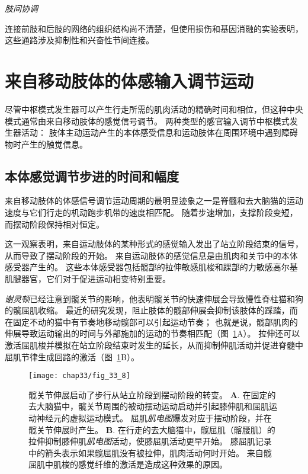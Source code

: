 \textit{肢间协调}

连接前肢和后肢的网络的组织结构尚不清楚，但使用损伤和基因消融的实验表明，这些通路涉及抑制性和兴奋性节间连接。



\section{来自移动肢体的体感输入调节运动}

尽管中枢模式发生器可以产生行走所需的肌肉活动的精确时间和相位，但这种中央模式通常由来自移动肢体的感觉信号调节。
两种类型的感官输入调节中枢模式发生器活动：
肢体主动运动产生的本体感受信息和运动肢体在周围环境中遇到障碍物时产生的触觉信息。



\subsection{本体感觉调节步进的时间和幅度}

来自移动肢体的体感信号调节运动周期的最明显迹象之一是脊髓和去大脑猫的运动速度与它们行走的机动跑步机带的速度相匹配。
随着步速增加，支撑阶段变短，而摆动阶段保持相对恒定。


这一观察表明，来自运动肢体的某种形式的感觉输入发出了站立阶段结束的信号，从而导致了摆动阶段的开始。
来自运动肢体的感觉信息是由肌肉和关节中的本体感受器产生的。
这些本体感受器包括髋部的拉伸敏感肌梭和踝部的力敏感高尔基肌腱器官，它们对于促进运动相变特别重要。


\textit{谢灵顿}已经注意到髋关节的影响，他表明髋关节的快速伸展会导致慢性脊柱猫和狗的髋屈肌收缩。
最近的研究发现，阻止肢体的髋部伸展会抑制该肢体的踩踏，而在固定不动的猫中有节奏地移动髋部可以引起运动节奏；
也就是说，髋部肌肉的伸展导致运动输出的时间与外部施加的运动的节奏相匹配（图~\ref{fig:33_8}A）。
拉伸还可以激活屈肌梭并模拟在站立阶段结束时发生的延长，从而抑制伸肌活动并促进脊髓中屈肌节律生成回路的激活（图~\ref{fig:33_8}B）。


\begin{figure}[htbp]
	\centering
	\texttt{[image: chap33/fig\_33\_8]}
	\caption{髋关节伸展启动了步行从站立阶段到摆动阶段的转变。
	\textbf{A}. 在固定的去大脑猫中，髋关节周围的被动摆动运动启动并引起膝伸肌和屈肌运动神经元的虚拟运动模式。
	屈肌\textit{肌电图}爆发对应于摆动阶段，并在髋关节伸展时产生\cite{kriellaars1994mechanical}。
	\textbf{B}. 在行走的去大脑猫中，髋屈肌（髂腰肌）的拉伸抑制膝伸肌\textit{肌电图}活动，使膝屈肌活动更早开始。
	膝屈肌记录中的箭头表示如果髋屈肌没有被拉伸，肌肉活动何时开始。
	来自髋屈肌中肌梭的感觉纤维的激活是造成这种效果的原因\cite{hiebert1996contribution}。}
	\label{fig:33_8}
\end{figure}


